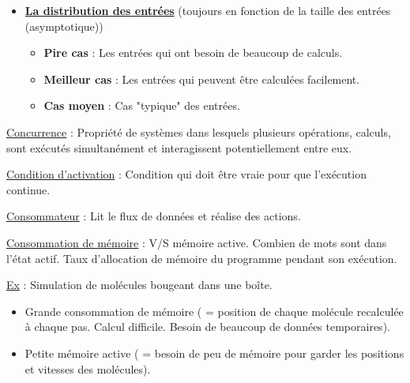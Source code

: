 \documentclass[fr,license=none]{../../../eplsummary}
\newcommand{\bigO}{\ensuremath{\mathcal{O}}}
\begin{document}
\begin{flushleft}
\begin{itemize}
\begin{itemize} [label=\textbullet, font=\MEDIUM]
\item \textbf{Notation big-$\Theta$} : Équivalence asymptotique (borne supérieure et inférieure).
$$f(n) \in \Theta (g(n)) \text{  si  } f(n) \in \bigO (g(n))  \text{  \underline{et}  } f(n) \in \Omega (g(n))$$


\end{itemize} \smallbreak

\item \underline{\textbf {La distribution des entrées}} (toujours en fonction de la taille des entrées (asymptotique))


\begin{itemize} [label=\textbullet, font=\MEDIUM]
\item \textbf{Pire cas} : Les entrées qui ont besoin de beaucoup de calculs.
\item \textbf{Meilleur cas} : Les entrées qui peuvent être calculées facilement.
\item \textbf{Cas moyen} : Cas "typique" des entrées.
\end{itemize}

\end{itemize} \bigbreak


\textcolor{mauvedef}{\underline{Concurrence}} : Propriété de systèmes dans lesquels plusieurs opérations, calculs, sont exécutés simultanément et interagissent potentiellement entre eux.\bigbreak


\textcolor{mauvedef}{\underline{Condition d’activation}} : Condition qui doit être vraie pour que l’exécution continue. \bigbreak


\textcolor{mauvedef}{\underline{Consommateur}} : Lit le flux de données et réalise des actions. \bigbreak


\textcolor{mauvedef}{\underline{Consommation de mémoire}} : V/S mémoire active. Combien de mots sont dans l'état actif. Taux d'allocation de mémoire du programme pendant son exécution.

\underline{Ex} : Simulation de molécules bougeant dans une boîte.

\begin{itemize}
\item Grande consommation de mémoire ( = position de chaque molécule recalculée à chaque pas. Calcul difficile. Besoin de beaucoup de données temporaires).
\item Petite mémoire active ( = besoin de peu de mémoire pour garder les positions et vitesses des molécules).
\end{itemize} \bigbreak



\end{flushleft}
\end{document}
